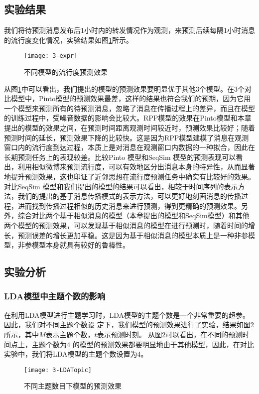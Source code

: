 \subsection{实验结果}
我们将待预测消息发布后1小时内的转发情况作为观测，来预测后续每隔1小时消息的流行度变化情况，实验结果如图\ref{fig:exprResult}所示。
\begin{figure}[!htbp]
  \centering
  \texttt{[image: 3-expr]}
  \caption{不同模型的流行度预测效果}
  \label{fig:exprResult}
\end{figure}


从图\ref{fig:exprResult}中可以看出，我们提出的模型的预测效果要明显优于其他3个模型。在3个对比模型中，Pinto模型的预测效果最差，这样的结果也符合我们的预期，因为它用一个模型来预测所有的待预测消息，忽略了消息在传播过程上的差异，而且在模型的训练过程中，受噪音数据的影响会比较大。RPP模型的效果在Pinto模型和本章提出的模型的效果之间，在预测时间距离观测时间较近时，预测效果比较好；随着预测时间的延长，预测效果下降的比较快。这是因为RPP模型建模了消息在观测窗口内的流行度到达过程，本质上是对消息在观测窗口内数据的一种拟合，因此在长期预测任务上的表现较差。比较Pinto 模型和SeqSim 模型的预测表现可以看出，利用相似微博来预测流行度，可以有效地区分出消息本身的特异性，从而显著地提升预测效果，这也印证了近邻思想在流行度预测任务中确实有比较好的效果。对比SeqSim 模型和我们提出的模型的结果可以看出，相较于时间序列的表示方法，我们的提出的基于消息传播模式的表示方法，可以更好地刻画消息的传播过程，进而找到传播过程相似的历史消息来进行预测，得到更精确的预测效果。另外，综合对比两个基于相似消息的模型（本章提出的模型和SeqSim模型）和其他两个模型的预测效果，可以发现基于相似消息的模型在进行预测时，随着时间的增长，预测误差的增长更加平稳。这是因为基于相似消息的模型本质上是一种非参模型，非参模型本身就具有较好的鲁棒性。

\subsection{实验分析}
\subsubsection{LDA模型中主题个数的影响}
在利用LDA模型进行主题学习时，LDA模型的主题个数是一个非常重要的超参。因此，我们对不同主题个数设
定下，我们模型的预测效果进行了实验，结果如图\ref{fig:ldaTopic}所示，其中$M$表示主题个数，$t$表示预测时刻。
从图\ref{fig:ldaTopic}可以看出，在不同的预测时间点上，主题个数为4 的模型的预测效果都要明显地由于其他模型，因此，在对比实验中，我们将LDA模型的主题个数设置为4。
\begin{figure}[!htbp]
  \centering
  \texttt{[image: 3-LDATopic]}
  \caption{不同主题数目下模型的预测效果}
  \label{fig:ldaTopic}
\end{figure}

